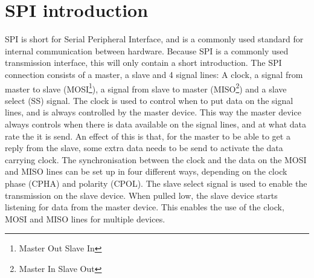 \section{SPI introduction}
SPI is short for Serial Peripheral Interface, and is a commonly used standard for internal communication between hardware. Because SPI is a commonly used transmission interface, this will only contain a short introduction. The  SPI connection consists of a master, a slave and 4 signal lines: A clock, a signal from master to slave (MOSI\footnote{Master Out Slave In}), a signal from slave to master (MISO\footnote{Master In Slave Out}) and a slave select (SS) signal. The clock is used to control when to put data on the signal lines, and is always controlled by the master device. This way the master device always controls when there is data available on the signal lines, and at what data rate the it is send. An effect of this is that, for the master to be able to get a reply from the slave, some extra data needs to be send to activate the data carrying clock. The synchronisation between the clock and the data on the MOSI and MISO lines can be set up in four different ways, depending on the clock phase (CPHA) and polarity (CPOL). The slave select signal is used to enable the transmission on the slave device. When pulled low, the slave device starts listening for data from the master device. This enables the use of the clock, MOSI and MISO lines for multiple devices. 




